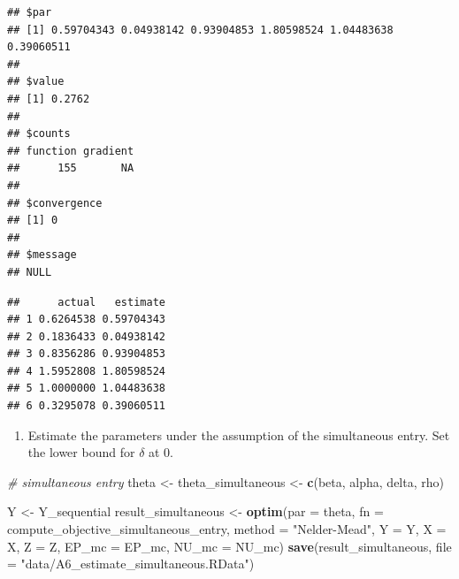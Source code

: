 \documentclass[]{book}
\newenvironment{Shaded}{\begin{snugshade}}{\end{snugshade}}
\newcommand{\KeywordTok}[1]{\textcolor[rgb]{0.13,0.29,0.53}{\textbf{#1}}}
\newcommand{\DataTypeTok}[1]{\textcolor[rgb]{0.13,0.29,0.53}{#1}}
\newcommand{\StringTok}[1]{\textcolor[rgb]{0.31,0.60,0.02}{#1}}
\newcommand{\CommentTok}[1]{\textcolor[rgb]{0.56,0.35,0.01}{\textit{#1}}}
\newcommand{\OperatorTok}[1]{\textcolor[rgb]{0.81,0.36,0.00}{\textbf{#1}}}
\newcommand{\NormalTok}[1]{#1}
\providecommand{\tightlist}{%
  \setlength{\itemsep}{0pt}\setlength{\parskip}{0pt}}
\begin{document}
\begin{verbatim}
## $par
## [1] 0.59704343 0.04938142 0.93904853 1.80598524 1.04483638 0.39060511
## 
## $value
## [1] 0.2762
## 
## $counts
## function gradient 
##      155       NA 
## 
## $convergence
## [1] 0
## 
## $message
## NULL
\end{verbatim}

\begin{Shaded}
\end{Shaded}

\begin{verbatim}
##      actual   estimate
## 1 0.6264538 0.59704343
## 2 0.1836433 0.04938142
## 3 0.8356286 0.93904853
## 4 1.5952808 1.80598524
## 5 1.0000000 1.04483638
## 6 0.3295078 0.39060511
\end{verbatim}

\begin{enumerate}
\def\labelenumi{\arabic{enumi}.}
\setcounter{enumi}{6}
\tightlist
\item
  Estimate the parameters under the assumption of the simultaneous
  entry. Set the lower bound for \(\delta\) at 0.
\end{enumerate}

\begin{Shaded}
\begin{Highlighting}[]
\CommentTok{# simultaneous entry}
\NormalTok{theta <-}\StringTok{ }\NormalTok{theta_simultaneous <-}
\StringTok{  }\KeywordTok{c}\NormalTok{(beta, alpha, delta, rho)}
\end{Highlighting}
\end{Shaded}

\begin{Shaded}
\begin{Highlighting}[]
\NormalTok{Y <-}\StringTok{ }\NormalTok{Y_sequential}
\NormalTok{result_simultaneous <-}
\StringTok{  }\KeywordTok{optim}\NormalTok{(}\DataTypeTok{par =}\NormalTok{ theta,}
        \DataTypeTok{fn =}\NormalTok{ compute_objective_simultaneous_entry,}
        \DataTypeTok{method =} \StringTok{"Nelder-Mead"}\NormalTok{,}
        \DataTypeTok{Y =}\NormalTok{ Y,}
        \DataTypeTok{X =}\NormalTok{ X,}
        \DataTypeTok{Z =}\NormalTok{ Z,}
        \DataTypeTok{EP_mc =}\NormalTok{ EP_mc,}
        \DataTypeTok{NU_mc =}\NormalTok{ NU_mc)}
\KeywordTok{save}\NormalTok{(result_simultaneous, }\DataTypeTok{file =} \StringTok{"data/A6_estimate_simultaneous.RData"}\NormalTok{)}
\end{Highlighting}
\end{Shaded}
\end{document}
